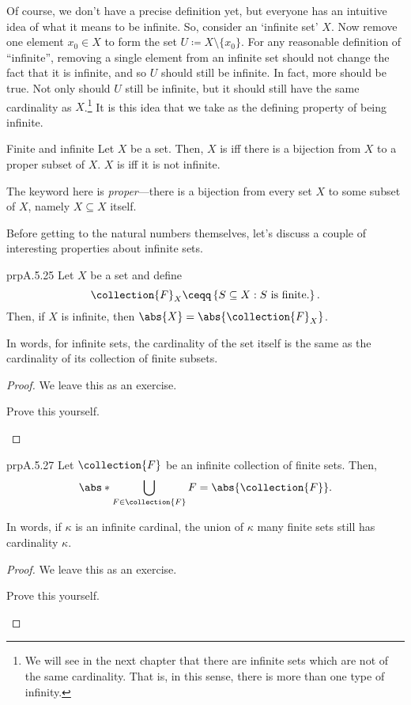 Of course, we don't have a precise definition yet, but everyone has an intuitive idea of what it means to be infinite.  So, consider an `infinite set' $X$.  Now remove one element $x_0\in X$ to form the set $U\coloneqq X\setminus \{ x_0\}$.  For any reasonable definition of ``infinite'', removing a single element from an infinite set should not change the fact that it is infinite, and so $U$ should still be infinite.  In fact, more should be true.  Not only should $U$ still be infinite, but it should still have the same cardinality as $X$.\footnote{We will see in the next chapter that there are infinite sets which are not of the same cardinality.  That is, in this sense, there is more than one type of infinity.}  It is this idea that we take as the defining property of being infinite.
\begin{dfn}{Finite and infinite}{}
	Let $X$ be a set.  Then, $X$ is  iff there is a bijection from $X$ to a proper subset of $X$.  $X$ is  iff it is not infinite.
	\begin{rmk}
		The keyword here is \emph{proper}---there is a bijection from every set $X$ to some subset of $X$, namely $X\subseteq X$ itself.
	\end{rmk}
\end{dfn}
Before getting to the natural numbers themselves, let's discuss a couple of interesting properties about infinite sets.
\begin{prp}{}{prpA.5.25}
	Let $X$ be a set and define
	\begin{equation}
		\collection{F}_X\ceqq \left\{ S\subseteq X:S\text{ is finite.}\right\} .
	\end{equation}
	Then, if $X$ is infinite, then $\abs{X}=\abs{\collection{F}_X}$.
	\begin{rmk}
		In words, for infinite sets, the cardinality of the set itself is the same as the cardinality of its collection of finite subsets.
	\end{rmk}
	\begin{proof}
		We leave this as an exercise.
		\begin{exr}[breakable=false]{}{}
			Prove this yourself.
		\end{exr}
	\end{proof}
\end{prp}
\begin{prp}{}{prpA.5.27}
	Let $\collection{F}$ be an infinite collection of finite sets.  Then,
	\begin{equation}
		\abs*{\bigcup _{F\in \collection{F}}F}=\abs{\collection{F}}.
	\end{equation}
	\begin{rmk}
		In words, if $\kappa$ is an infinite cardinal, the union of $\kappa$ many finite sets still has cardinality $\kappa$.
	\end{rmk}
	\begin{proof}
		We leave this as an exercise.
		\begin{exr}[breakable=false]{}{}
			Prove this yourself.
		\end{exr}
	\end{proof}
\end{prp}
